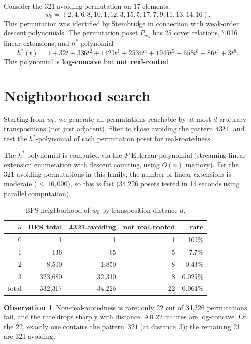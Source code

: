 \documentclass[11pt,reqno]{amsart}
\theoremstyle{definition}
\newtheorem{observation}[theorem]{Observation}
\begin{document}
Consider the 321-avoiding permutation on 17 elements:
\[
  w_0 = (2,4,6,8,10,1,12,3,15,5,17,7,9,11,13,14,16).
\]
This permutation was identified by Stembridge in connection with
weak-order descent polynomials.  The permutation poset $P_{w_0}$
has 25 cover relations, 7{,}016 linear extensions, and
$h^*$-polynomial
\[
  h^*(t) = 1 + 32t + 336t^2 + 1420t^3 + 2534t^4 + 1946t^5 + 658t^6 + 86t^7 + 3t^8.
\]
This polynomial is \textbf{log-concave} but \textbf{not real-rooted}.


\section{Neighborhood search}\label{sec:neighborhood}

Starting from $w_0$, we generate all permutations reachable by
at most $d$ arbitrary transpositions (not just adjacent), filter
to those avoiding the pattern $4321$, and test the $h^*$-polynomial
of each permutation poset for real-rootedness.

The $h^*$-polynomial is computed via the $P$-Eulerian polynomial
(streaming linear extension enumeration with descent counting,
using $O(n)$ memory).  For the 321-avoiding permutations in this
family, the number of linear extensions is moderate (${\leq}\,16{,}000$),
so this is fast (34{,}226 posets tested in 14 seconds using parallel
computation).

\begin{table}[ht]
\centering
\caption{BFS neighborhood of $w_0$ by transposition distance $d$.}
\label{tab:counts}
\begin{tabular}{rrrrr}
\toprule
$d$ & BFS total & 4321-avoiding & not real-rooted & rate \\
\midrule
0 &         1 &       1 &  1 & 100\%    \\
1 &       136 &      65 &  5 & 7.7\%    \\
2 &     8{,}500 &   1{,}850 &  8 & 0.43\%   \\
3 &   323{,}680 &  32{,}310 &  8 & 0.025\%  \\
\midrule
total & 332{,}317 & 34{,}226 & 22 & 0.064\% \\
\bottomrule
\end{tabular}
\end{table}

\begin{observation}\label{obs:rare}
Non-real-rootedness is rare: only 22 out of 34{,}226 permutations
fail, and the rate drops sharply with distance.
All 22 failures are log-concave.
Of the 22, exactly one contains the pattern~$321$ (at distance~3);
the remaining 21 are 321-avoiding.
\end{observation}
\end{document}
